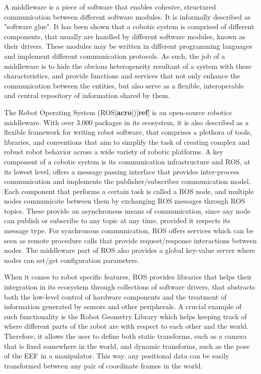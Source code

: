 \par A middleware is a piece of software that enables cohesive, structured communication between different software modules. It is informally described as "software glue". It has been shown that a cobotic system is comprised of different components, that usually are handled by different software modules, known as their drivers. These modules may be written in different programming languages and implement different communication protocols. As such, the job of a middleware is to hide the obvious heterogeneity resultant of a system with these characteristics, and provide functions and services that not only enhance the communication between the entities, but also serve as a flexible, interoperable and central repository of information shared by them.
\par The Robot Operating System (ROS[\textbf{acro}])[\textbf{ref}] is an open-source robotics middleware. With over 3.000 packages in its ecosystem, it is also described as a flexible framework for writing robot software, that comprises a plethora of tools, libraries, and conventions that aim to simplify the task of creating complex and robust robot behavior across a wide variety of robotic platforms. A key component of a cobotic system is its communication infrastructure and ROS, at its lowest level, offers a message passing interface that provides inter-process communication and implements the publisher/subscriber communication model. Each component that performs a certain task is called a ROS node, and multiple nodes communicate between them by exchanging ROS messages through ROS topics. These provide an asynchronous means of communication, since any node can publish or subscribe to any topic at any time, provided it respects its message type. For synchronous communication, ROS offers services which can be seen as remote procedure calls that provide request/response interactions between nodes. The middleware part of ROS also provides a global key-value server where nodes can set/get configuration parameters.
\par When it comes to robot specific features, ROS provides libraries that helps their integration  in its ecosystem through collections of software drivers, that abstracts both the low-level control of hardware components and the treatment of information generated by sensors and other peripherals. A crucial example of such functionality is the Robot Geometry Library which helps keeping track of where different parts of the robot are with respect to each other and the world. Therefore, it allows the user to define both static transforms, such as a camera that is fixed somewhere in the world, and dynamic transforms, such as the pose of the EEF in a manipulator. This way, any positional data can be easily transformed between any pair of coordinate frames in the world.

